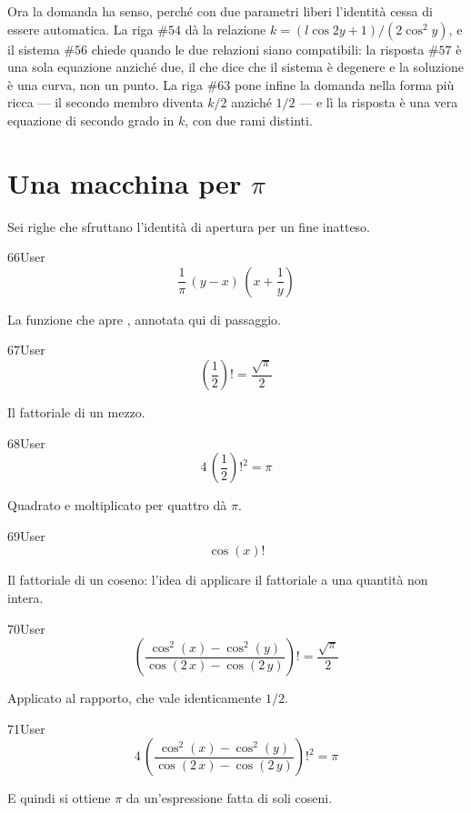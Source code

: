 Ora la domanda ha senso, perché con due parametri liberi l'identità cessa di essere automatica. La riga $\#54$ dà la relazione $k=\left(l\cos2y+1\right)/\left(2\cos^2y\right)$, e il sistema $\#56$ chiede quando le due relazioni siano compatibili: la risposta $\#57$ è una sola equazione anziché due, il che dice che il sistema è degenere e la soluzione è una curva, non un punto. La riga $\#63$ pone infine la domanda nella forma più ricca — il secondo membro diventa $k/2$ anziché $1/2$ — e lì la risposta è una vera equazione di secondo grado in $k$, con due rami distinti.

\section{Una macchina per $\pi$}

Sei righe che sfruttano l'identità di apertura per un fine inatteso.

\begin{espr}{66}{User}{}
\[
\frac{1}{\pi}\, \left(y - x\right)\, \left(x + \frac{1}{y}\right)
\]
\end{espr}
La funzione che apre , annotata qui di passaggio.

\begin{espr}{67}{User}{\verificata}
\[
\left(\frac{1}{2}\right)! = \frac{\sqrt{\pi}}{2}
\]
\end{espr}
Il fattoriale di un mezzo.

\begin{espr}{68}{User}{\verificata}
\[
4\, \left(\frac{1}{2}\right)!^{2} = \pi
\]
\end{espr}
Quadrato e moltiplicato per quattro dà $\pi$.

\begin{espr}{69}{User}{}
\[
\cos\!\left(x\right)!
\]
\end{espr}
Il fattoriale di un coseno: l'idea di applicare il fattoriale a una quantità non intera.

\begin{espr}{70}{User}{\verificata}
\[
\left(\frac{\cos^{2}\!\left(x\right) - \cos^{2}\!\left(y\right)}{\cos\!\left(2\, x\right) - \cos\!\left(2\, y\right)}\right)! = \frac{\sqrt{\pi}}{2}
\]
\end{espr}
Applicato al rapporto, che vale identicamente $1/2$.

\begin{espr}{71}{User}{\verificata}
\[
4\, \left(\frac{\cos^{2}\!\left(x\right) - \cos^{2}\!\left(y\right)}{\cos\!\left(2\, x\right) - \cos\!\left(2\, y\right)}\right)!^{2} = \pi
\]
\end{espr}
E quindi si ottiene $\pi$ da un'espressione fatta di soli coseni.



